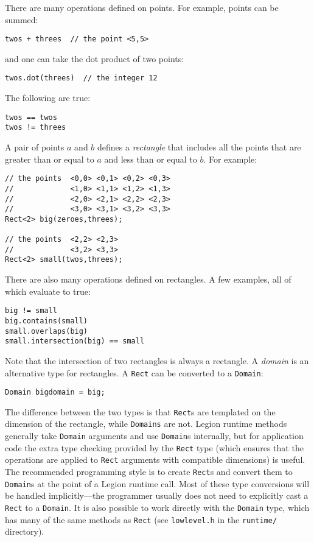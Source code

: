 There are many operations defined on points.  For example, points can be summed:
\begin{verbatim}
twos + threes  // the point <5,5>
\end{verbatim}
and one can take the dot product of two points:             
\begin{verbatim}
twos.dot(threes)  // the integer 12
\end{verbatim}
The following are true:
\begin{verbatim}
twos == twos   
twos != threes 
\end{verbatim}
A pair of points $a$ and $b$ defines a {\em rectangle} that includes all the points that are greater than or equal to $a$
and less than or equal to $b$.  For example:
\begin{verbatim}
// the points  <0,0> <0,1> <0,2> <0,3> 
//             <1,0> <1,1> <1,2> <1,3>
//             <2,0> <2,1> <2,2> <2,3>
//             <3,0> <3,1> <3,2> <3,3>
Rect<2> big(zeroes,threes);  

// the points  <2,2> <2,3>
//             <3,2> <3,3>
Rect<2> small(twos,threes);
\end{verbatim}
There are also many operations defined on rectangles.  A few examples, all of which evaluate to true:
\begin{verbatim}
big != small                       
big.contains(small)                
small.overlaps(big)                
small.intersection(big) == small   
\end{verbatim}
Note that the intersection of two rectangles is always a rectangle.
A {\em domain} is an alternative type for rectangles.  A {\tt Rect} can be converted to a {\tt Domain}:
\begin{verbatim}
Domain bigdomain = big;
\end{verbatim}
The difference between the two types is that {\tt Rect}s are templated on the dimension of the rectangle, while {\tt Domains}
are not.  Legion runtime methods generally take {\tt Domain} arguments and use {\tt Domain}s internally, but for application
code the extra type checking provided by the {\tt Rect} type (which ensures that the operations are applied to {\tt Rect} arguments
with compatible dimensions) is useful.  The recommended programming style is to create {\tt Rect}s and convert them to {\tt Domain}s
at the point of a Legion runtime call.  Most of these type conversions will be handled implicitly---the programmer usually does not need to explicitly cast
a {\tt Rect} to a {\tt Domain}. It is also possible to work directly with the {\tt Domain} type, which has many
of the same methods as {\tt Rect} (see {\tt lowlevel.h} in the {\tt runtime/} directory).

